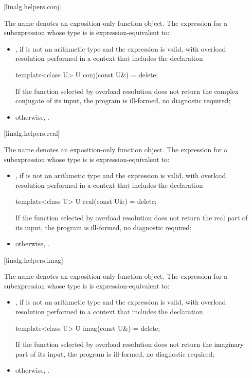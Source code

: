 [linalg.helpers.conj]{}

\pnum
The name  denotes an exposition-only function object.
The expression  for a subexpression 
whose type is  is expression-equivalent to:
\begin{itemize}
\item
{},
if  is not an arithmetic type and
the expression  is valid,
with overload resolution performed in a context that includes the declaration
\begin{codeblock}
template<class U> U conj(const U&) = delete;
\end{codeblock}
If the function selected by overload resolution
does not return the complex conjugate of its input,
the program is ill-formed, no diagnostic required;
\item
otherwise, .
\end{itemize}

[linalg.helpers.real]{}

\pnum
The name  denotes an exposition-only function object.
The expression  for a subexpression 
whose type is  is expression-equivalent to:
\begin{itemize}
\item
{},
if  is not an arithmetic type and
the expression  is valid,
with overload resolution performed in a context that includes the declaration
\begin{codeblock}
template<class U> U real(const U&) = delete;
\end{codeblock}
If the function selected by overload resolution
does not return the real part of its input,
the program is ill-formed, no diagnostic required;
\item
otherwise, .
\end{itemize}

[linalg.helpers.imag]{}

\pnum
The name  denotes an exposition-only function object.
The expression  for a subexpression 
whose type is  is expression-equivalent to:
\begin{itemize}
\item
{},
if  is not an arithmetic type and the expression 
is valid, with overload resolution performed in a context
that includes the declaration
\begin{codeblock}
template<class U> U imag(const U&) = delete;
\end{codeblock}
If the function selected by overload resolution
does not return the imaginary part of its input,
the program is ill-formed, no diagnostic required;
\item
otherwise, .
\end{itemize}

